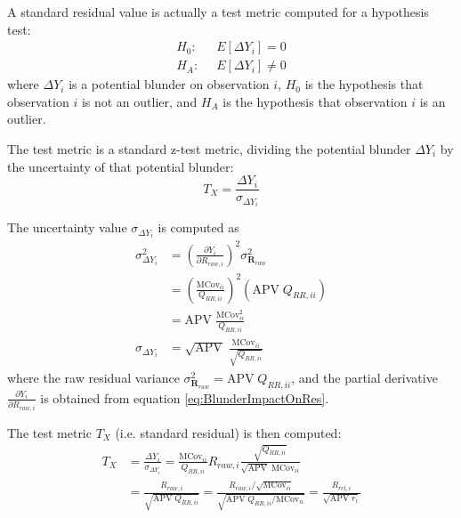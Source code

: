A standard residual value is actually a test metric computed for a hypothesis test:
\begin{equation}\label{eq:HypTest}
\begin{split}
H_0 : \;\; &E[\Delta Y_i] = 0 \\
H_A : \;\; &E[\Delta Y_i] \ne 0
\end{split}
\end{equation}
where $\Delta Y_i$ is a potential blunder on observation $i$, $H_0$ is the hypothesis that observation $i$ is not an outlier, and $H_A$ is the hypothesis that observation $i$ is an outlier.

The test metric is a standard z-test metric, dividing the potential blunder $\Delta Y_i$ by the uncertainty of that potential blunder:
\begin{equation}\label{eq:TestMetric}
T_X = \frac{\Delta Y_i}{\sigma_{\Delta Y_i}}
\end{equation}

The uncertainty value $\sigma_{\Delta Y_i}$ is computed as
\begin{equation}\label{eq:SigmaY}
\begin{split}
\sigma_{\Delta Y_i}^2 &= \left( \frac{\partial Y_i}{\partial R_{raw,i}} \right)^2 \sigma_{\textbf{R}_{raw}}^2 \\
&= \left( \frac{\text{MCov}_{ii}}{Q_{RR,ii}}\right)^2 \left(\text{APV} \; Q_{RR,ii}\right) \\
&= \text{APV} \; \frac{\text{MCov}_{ii}^2}{Q_{RR,ii}} \\
\sigma_{\Delta Y_i} &= \sqrt{\text{APV}} \; \frac{\text{MCov}_{ii}}{\sqrt{Q_{RR,ii}}}
\end{split}
\end{equation}
where the raw residual variance $\sigma_{\textbf{R}_{raw}}^2 = \text{APV} \; Q_{RR,ii}$, and the partial derivative $\frac{\partial Y_i}{\partial R_{raw,i}}$ is obtained from equation \ref{eq:BlunderImpactOnRes}.

The test metric $T_X$ (i.e. standard residual) is then computed:
\begin{equation}\label{eq:TestMetricStdRes}
\begin{split}
T_X &= \frac{\Delta Y_i}{\sigma_{\Delta Y_i}} = \frac{\text{MCov}_{ii}}{Q_{RR,ii}} R_{raw,i} \frac{\sqrt{Q_{RR,ii}}}{\sqrt{\text{APV}} \; \text{MCov}_{ii}} \\
&= \frac{R_{raw,i}}{\sqrt{\text{APV} \; Q_{RR,ii}}} = \frac{R_{raw,i} / \sqrt{\text{MCov}_{ii}} }{\sqrt{\text{APV} \; Q_{RR,ii} / \text{MCov}_{ii}}} = \frac{R_{rel,i}}{\sqrt{\text{APV} \; r_i}}
\end{split}
\end{equation}


